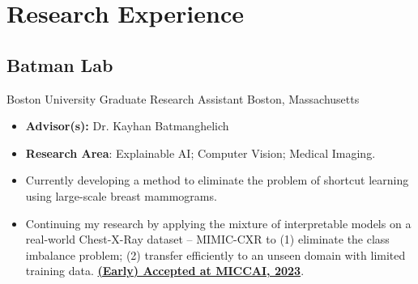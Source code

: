 \documentclass[11pt,letter,sans]{moderncv}
\begin{document}
\section{ Research Experience }
\subsection{Batman Lab}
      {Boston University}%
      {Graduate Research Assistant}%
      {Boston, Massachusetts}%
      {}%
      {
        \begin{itemize}
        \item {\bf Advisor(s):} Dr. Kayhan Batmanghelich
        \item {\bf Research Area}: Explainable AI; Computer Vision; Medical Imaging.
        \item Currently developing a method to eliminate the problem of shortcut learning using large-scale breast mammograms.
        \item Continuing my research by applying the mixture of interpretable models on a real-world Chest-X-Ray dataset -- MIMIC-CXR to (1) eliminate the class imbalance problem; (2) transfer efficiently to an unseen domain with limited training data.
        \href{https://shantanu48114860.github.io/projects/MICCAI-2023-MoIE-CXR/}{\textbf{(Early) Accepted at MICCAI, 2023}}.
        \end{itemize}
      }
  
\end{document}
